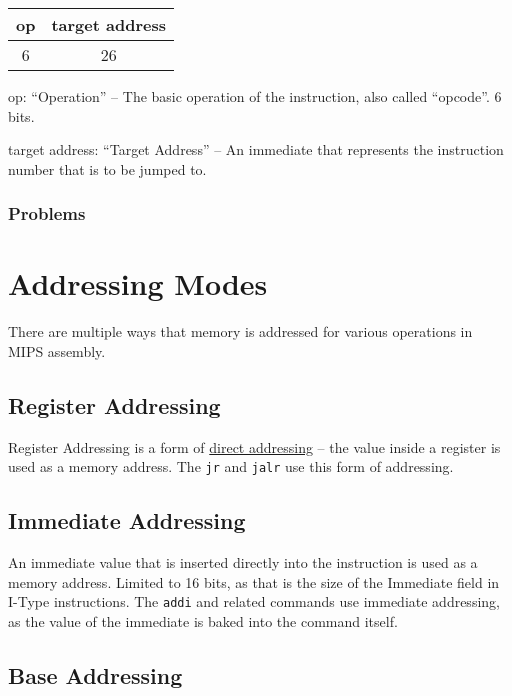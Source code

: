 \documentclass{article}
\begin{document}
\begin{tabular}{| c | c |}
    \hline
        op & target address \\
        \hline
        6 & 26 \\
    \hline
\end{tabular}

op: ``Operation'' -- The basic operation of the instruction, also called ``opcode''. 6 bits.

target address: ``Target Address'' -- An immediate that represents the instruction number that is to be jumped to. 

\subsubsection{Problems}\label{JTypeProblems}



\section{Addressing Modes}\label{Addressing}

There are multiple ways that memory is addressed for various operations in MIPS assembly. 


\subsection{Register Addressing}

Register Addressing is a form of \underline{direct addressing} -- the value inside a register is used as a memory address. The \texttt{jr} and \texttt{jalr} use this form of addressing. 


\subsection{Immediate Addressing}

An immediate value that is inserted directly into the instruction is used as a memory address. Limited to 16 bits, as that is the size of the Immediate field in I-Type instructions. The \texttt{addi} and related commands use immediate addressing, as the value of the immediate is baked into the command itself. 


\subsection{Base Addressing}
\end{document}
